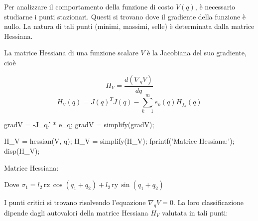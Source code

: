 \documentclass[11pt, a4paper]{article}
\begin{document}
\begin{par}
\begin{flushleft}
Per analizzare il comportamento della funzione di costo $V(q)$, è necessario studiarne i punti stazionari. Questi si trovano dove il gradiente della funzione è nullo. La natura di tali punti (minimi, massimi, selle) è determinata dalla matrice Hessiana.

La matrice Hessiana di una funzione scalare $V$ è la Jacobiana del suo gradiente, cioè
\end{flushleft}
\end{par}
\[
    H_V =\frac{d(\nabla_q V)}{dq}
\]
\[
    H_V (q) = J(q)^T J(q)-\sum_{k=1}^m e_k (q) H_{f_k} (q)
\]

\newpage
\begin{matlabcode}
gradV = -J_q.' * e_q;
gradV = simplify(gradV);

H_V = hessian(V, q);
H_V = simplify(H_V);
fprintf('Matrice Hessiana:');
disp(H_V);
\end{matlabcode}

\begin{matlaboutput}
Matrice Hessiana:
\end{matlaboutput}
\begin{matlabsymbolicoutput}
\end{matlabsymbolicoutput}
\vspace{0.5cm}
\begin{matlabsymbolicoutput}
Dove $\sigma_1 =l_2 \,\textrm{rx}\,\cos \left(q_1 +q_2 \right)+l_2 \,\textrm{ry}\,\sin \left(q_1 +q_2 \right)$
\end{matlabsymbolicoutput}
\begin{matlabcode}
\end{matlabcode}

\begin{par}
\begin{flushleft}
I punti critici si trovano risolvendo l'equazione $\nabla_q V=0$. La loro classificazione dipende dagli autovalori della matrice Hessiana $H_V$ valutata in tali punti:
\end{flushleft}
\end{par}
\end{document}
